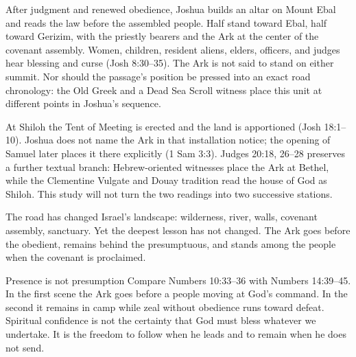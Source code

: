 After judgment and renewed obedience, Joshua builds an altar on Mount Ebal and
reads the law before the assembled people.  Half stand toward Ebal, half toward
Gerizim, with the priestly bearers and the Ark at the center of the covenant
assembly.  Women, children, resident aliens, elders, officers, and judges hear
blessing and curse (Josh 8:30--35).  The Ark is not said to stand on either
summit.  Nor should the passage's position be pressed into an exact road
chronology: the Old Greek and a Dead Sea Scroll witness place this unit at
different points in Joshua's sequence.

At Shiloh the Tent of Meeting is erected and the land is apportioned
(Josh 18:1--10).  Joshua does not name the Ark in that installation notice;
the opening of Samuel later places it there explicitly (1 Sam 3:3).  Judges
20:18, 26--28 preserves a further textual branch: Hebrew-oriented witnesses
place the Ark at Bethel, while the Clementine Vulgate and Douay tradition read
the house of God as Shiloh.  This study will not turn the two readings into two
successive stations.

The road has changed Israel's landscape: wilderness, river, walls, covenant
assembly, sanctuary.  Yet the deepest lesson has not changed.  The Ark goes
before the obedient, remains behind the presumptuous, and stands among the
people when the covenant is proclaimed.

\begin{studybox}{Presence is not presumption}
Compare Numbers 10:33--36 with Numbers 14:39--45.  In the first scene the Ark
goes before a people moving at God's command.  In the second it remains in camp
while zeal without obedience runs toward defeat.  Spiritual confidence is not
the certainty that God must bless whatever we undertake.  It is the freedom to
follow when he leads and to remain when he does not send.
\end{studybox}

